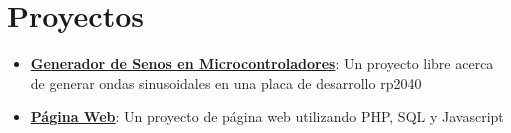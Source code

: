 \documentclass[letterpaper,11pt]{article}
\newcommand{\resumeItem}[2]{
	\item\small{
		\textbf{#1}{: #2 \vspace{-3pt}}
	}
}
\newcommand{\resumeSubItem}[2]{\resumeItem{#1}{#2}\vspace{-5pt}}
\newcommand{\resumeSubHeadingListStart}{\begin{itemize}[leftmargin=*]}
\newcommand{\resumeSubHeadingListEnd}{\end{itemize}\vspace{-16pt}}
\begin{document}
	\vspace{1mm}
	\section{Proyectos}
	\resumeSubHeadingListStart
	\resumeSubItem{\href{https://github.com/SantiagoCalligari/SinGeneratorOnRaspPico}{Generador de Senos en Microcontroladores}}
	{Un proyecto libre acerca de generar ondas sinusoidales en una placa de desarrollo rp2040}
	\resumeSubItem{\href{calligari.ar/LaMerendola}{Página Web}}{Un proyecto de página web utilizando PHP, SQL y Javascript}
	\resumeSubHeadingListEnd
	
	
	\vspace{1mm}
	
	
	
	
	
	
	
\end{document}
